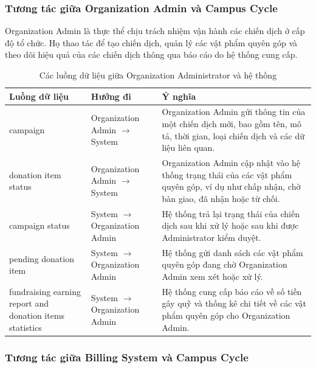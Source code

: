 \documentclass[12pt,a4paper]{report}
\begin{document}
\subsubsection{Tương tác giữa Organization Admin và Campus Cycle}

Organization Admin là thực thể chịu trách nhiệm vận hành các chiến dịch ở cấp độ tổ chức. Họ thao tác để tạo chiến dịch, quản lý các vật phẩm quyên góp và theo dõi hiệu quả của các chiến dịch thông qua báo cáo do hệ thống cung cấp.

\begin{table}[H]
\centering
\caption{Các luồng dữ liệu giữa Organization Administrator và hệ thống}
\label{tab:org-admin-system-data-flow}

\begin{tabular}{|p{4cm}|p{4cm}|p{7cm}|}
\hline
\textbf{Luồng dữ liệu} & \textbf{Hướng đi} & \textbf{Ý nghĩa} \\
\hline

campaign &
Organization Admin $\rightarrow$ System &
Organization Admin gửi thông tin của một chiến dịch mới, bao gồm tên, mô tả, thời gian, loại chiến dịch và các dữ liệu liên quan. \\
\hline

donation item status &
Organization Admin $\rightarrow$ System &
Organization Admin cập nhật vào hệ thống trạng thái của các vật phẩm quyên góp, ví dụ như chấp nhận, chờ bàn giao, đã nhận hoặc từ chối. \\
\hline

campaign status &
System $\rightarrow$ Organization Admin &
Hệ thống trả lại trạng thái của chiến dịch sau khi xử lý hoặc sau khi được Administrator kiểm duyệt. \\
\hline

pending donation item &
System $\rightarrow$ Organization Admin &
Hệ thống gửi danh sách các vật phẩm quyên góp đang chờ Organization Admin xem xét hoặc xử lý. \\
\hline

fundraising earning report and donation items statistics &
System $\rightarrow$ Organization Admin &
Hệ thống cung cấp báo cáo về số tiền gây quỹ và thống kê chi tiết về các vật phẩm quyên góp cho Organization Admin. \\
\hline

\end{tabular}
\end{table}

\subsubsection{Tương tác giữa Billing System và Campus Cycle}
\end{document}
